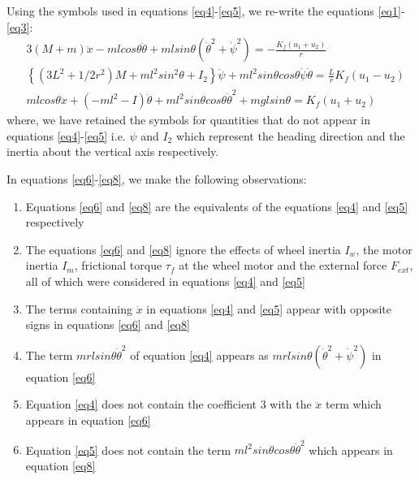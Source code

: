 \documentclass[a4paper,10pt]{article}
\begin{document}
Using the symbols used in equations \ref{eq4}-\ref{eq5}, we re-write the equations \ref{eq1}-\ref{eq3}:
\begin{align}
 &3(M+m)\ddot{x}-mlcos\theta\ddot{\theta}+mlsin\theta({\dot{\theta}}^2+{\dot{\psi}}^2)=-\frac{K_f(u_1+u_2)}{r} \label{eq6} \\
 &\left\lbrace(3L^2+1/2r^2)M+ml^2sin^2\theta+I_2\right\rbrace\ddot{\psi}+ml^2sin\theta cos\theta\dot{\psi}\dot{\theta}=\frac{L}{r}K_f(u_1-u_2) \label{eq7} \\
 &mlcos\theta\ddot{x}+(-ml^2-I)\ddot{\theta}+ml^2sin\theta cos\theta {\dot{\theta}}^2+mglsin\theta=K_f(u_1+u_2) \label{eq8}
\end{align} where, we have retained the symbols for quantities that do not appear in equations 
\ref{eq4}-\ref{eq5} i.e. $\psi$ and $I_2$ which represent the heading direction and the inertia 
about the vertical axis respectively.

In equations \ref{eq6}-\ref{eq8}, we make the following observations:
\begin{enumerate}[label=(\roman*)]
 \item Equations \ref{eq6} and \ref{eq8} are the equivalents of the equations \ref{eq4} and \ref{eq5} respectively
 \item The equations \ref{eq6} and \ref{eq8} ignore the effects of wheel inertia $I_w$, the motor inertia $I_m$, frictional
 torque $\tau_f$ at the wheel motor and the external force $F_{ext}$, all of which were considered in equations \ref{eq4} and \ref{eq5}
 \item The terms containing $\ddot{x}$ in equations \ref{eq4} and \ref{eq5} appear with opposite signs in equations \ref{eq6} and \ref{eq8} \label{item:ddotx}
 \item The term $mrlsin\theta{\dot\theta}^2$ of equation \ref{eq4} appears as $mrlsin\theta({\dot\theta}^2+{\dot\psi}^2)$ in equation \ref{eq6} \label{item:psi}
 \item Equation \ref{eq4} does not contain the coefficient $3$ with the $\ddot{x}$ term which appears in equation \ref{eq6} \label{item:coeff3}
 \item Equation \ref{eq5} does not contain the term $ml^2sin\theta cos\theta {\dot{\theta}}^2$ which appears in equation \ref{eq8} \label{item:corriolis}
\end{enumerate}
\end{document}
